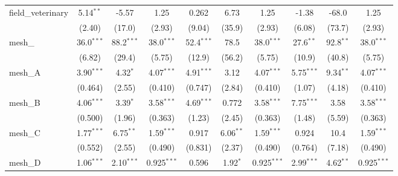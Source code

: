 \begin{tabular}{lccccccccc}
   field\_veterinary                                           & 5.14$^{**}$   & -5.57          & 1.25          & 0.262         & 6.73          & 1.25          & -1.38         & -68.0          & 1.25\\   
                                                               & (2.40)        & (17.0)         & (2.93)        & (9.04)        & (35.9)        & (2.93)        & (6.08)        & (73.7)         & (2.93)\\   
   mesh\_                                                      & 36.0$^{***}$  & 88.2$^{***}$   & 38.0$^{***}$  & 52.4$^{***}$  & 78.5          & 38.0$^{***}$  & 27.6$^{**}$   & 92.8$^{**}$    & 38.0$^{***}$\\   
                                                               & (6.82)        & (29.4)         & (5.75)        & (12.9)        & (56.2)        & (5.75)        & (10.9)        & (40.8)         & (5.75)\\   
   mesh\_A                                                     & 3.90$^{***}$  & 4.32$^{*}$     & 4.07$^{***}$  & 4.91$^{***}$  & 3.12          & 4.07$^{***}$  & 5.75$^{***}$  & 9.34$^{**}$    & 4.07$^{***}$\\   
                                                               & (0.464)       & (2.55)         & (0.410)       & (0.747)       & (2.84)        & (0.410)       & (1.07)        & (4.18)         & (0.410)\\   
   mesh\_B                                                     & 4.06$^{***}$  & 3.39$^{*}$     & 3.58$^{***}$  & 4.69$^{***}$  & 0.772         & 3.58$^{***}$  & 7.75$^{***}$  & 3.58           & 3.58$^{***}$\\   
                                                               & (0.500)       & (1.96)         & (0.363)       & (1.23)        & (2.45)        & (0.363)       & (1.48)        & (5.59)         & (0.363)\\   
   mesh\_C                                                     & 1.77$^{***}$  & 6.75$^{**}$    & 1.59$^{***}$  & 0.917         & 6.06$^{**}$   & 1.59$^{***}$  & 0.924         & 10.4           & 1.59$^{***}$\\   
                                                               & (0.552)       & (2.55)         & (0.490)       & (0.831)       & (2.37)        & (0.490)       & (0.764)       & (7.18)         & (0.490)\\   
   mesh\_D                                                     & 1.06$^{***}$  & 2.10$^{***}$   & 0.925$^{***}$ & 0.596         & 1.92$^{*}$    & 0.925$^{***}$ & 2.99$^{***}$  & 4.62$^{**}$    & 0.925$^{***}$\\   

\end{tabular}
